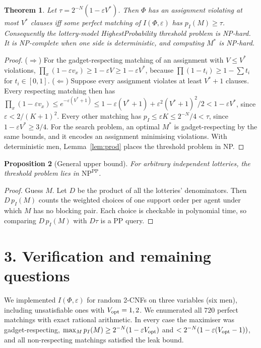 \documentclass[11pt]{article}
\newtheorem{theorem}{Theorem}
\newtheorem{proposition}[theorem]{Proposition}
\theoremstyle{definition}
\begin{document}
\begin{theorem}\label{thm:main}
Let $\tau=2^{-N}(1-\varepsilon V^*)$. Then $\Phi$ has an assignment violating at most $V^*$ clauses iff some perfect matching of
$I(\Phi,\varepsilon)$ has $p_I(M)\ge\tau$. Consequently the lottery-model HighestProbability threshold problem is NP-hard. It is
NP-complete when one side is deterministic, and computing $M^*$ is NP-hard.
\end{theorem}
\begin{proof}
($\Rightarrow$) For the gadget-respecting matching of an assignment with $V\le V^*$ violations,
$\prod_x(1-\varepsilon v_x)\ge1-\varepsilon V\ge1-\varepsilon V^*$, because $\prod(1-t_i)\ge1-\sum t_i$ for $t_i\in[0,1]$.
($\Leftarrow$) Suppose every assignment violates at least $V^*+1$ clauses. Every respecting matching then has
$\prod_x(1-\varepsilon v_x)\le e^{-\varepsilon(V^*+1)}\le1-\varepsilon(V^*+1)+\varepsilon^2(V^*+1)^2/2<1-\varepsilon V^*$,
since $\varepsilon<2/(K+1)^2$. Every other matching has $p_I\le\varepsilon K\le2^{-N}/4<\tau$, since
$1-\varepsilon V^*\ge3/4$.
For the search problem, an optimal $M^*$ is gadget-respecting by the same bounds, and it encodes an assignment
minimising violations. With deterministic men, Lemma~\ref{lem:prod} places the threshold problem in NP.
\end{proof}

\begin{proposition}[General upper bound]
For arbitrary independent lotteries, the threshold problem lies in $\mathrm{NP}^{\mathrm{PP}}$.
\end{proposition}
\begin{proof}
Guess $M$. Let $D$ be the product of all the lotteries' denominators. Then $D\,p_I(M)$ counts the weighted
choices of one support order per agent under which $M$ has no blocking pair. Each choice is checkable in polynomial time,
so comparing $D\,p_I(M)$ with $D\tau$ is a PP query.
\end{proof}

\section*{3. Verification and remaining questions}
We implemented $I(\Phi,\varepsilon)$ for random 2-CNFs on three variables (six men), including unsatisfiable ones with $V_{\rm opt}=1,2$.
We enumerated all $720$ perfect matchings with exact rational arithmetic. In every case the maximiser was
gadget-respecting, $\max_Mp_I(M)\ge2^{-N}(1-\varepsilon V_{\rm opt})$ and $<2^{-N}(1-\varepsilon(V_{\rm opt}-1))$,
and all non-respecting matchings satisfied the leak bound.
\end{document}

